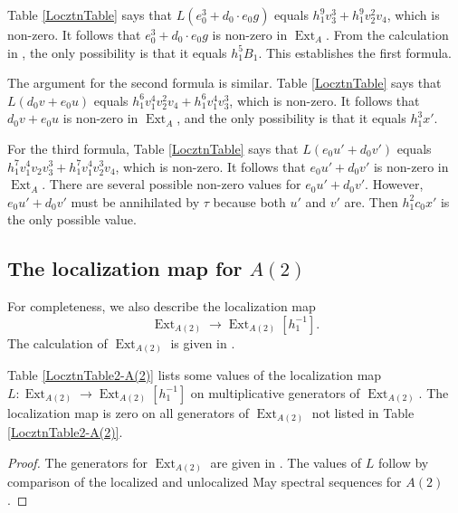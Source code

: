 \documentclass[10pt]{amsart}
\begin{document}
\begin{pf}
Table \ref{LocztnTable} says that 
$L( e_0^3 + d_0 \cdot e_0g)$ equals $h_1^9 v_3^3 + h_1^9 v_2^2 v_4$, which is non-zero.
It follows that $e_0^3+d_0 \cdot e_0g$ is non-zero in $\operatorname{Ext}_A$. 
From the calculation in \cite{Istems}, 
the only possibility is that it equals $h_1^5 B_1$.
This establishes the first formula.

The argument for the second formula is similar.
Table \ref{LocztnTable} says that 
$L(d_0 v + e_0 u )$ equals
$h_1^6 v_1^4 v_2^2 v_4 + h_1^6 v_1^4 v_3^3$, which is non-zero.
It follows that 
$d_0 v + e_0 u$ is non-zero in $\operatorname{Ext}_A$, and the only possibility is that
it equals $h_1^3 x'$.

For the third formula,
Table \ref{LocztnTable} says that
$L(e_0 u' + d_0 v')$ equals
$h_1^7 v_1^4 v_2 v_3^3 + h_1^7 v_1^4 v_2^3 v_4$, which is non-zero.
It follows that 
$e_0 u' + d_0 v'$ is non-zero in $\operatorname{Ext}_A$.
There are several possible non-zero values for $e_0 u' + d_0 v'$.
However,
$e_0 u' + d_0 v'$ must be annihilated by $\tau$ because both
$u'$ and $v'$ are.
Then  
$h_1^2 c_0 x'$ is the only possible value.
\end{pf}

\subsection{The localization map for $A(2)$}

For completeness, we also describe the localization map 
\[ \operatorname{Ext}_{A(2)}{\longrightarrow} \operatorname{Ext}_{A(2)}[h_1^{-1}].
 \]
The calculation of $\operatorname{Ext}_{A(2)}$ is given in \cite{IMotA(2)}.

\begin{prop}
Table \ref{LocztnTable2-A(2)} lists some values of the localization map
$L: \operatorname{Ext}_{A(2)} {\longrightarrow} \operatorname{Ext}_{A(2)}[h_1^{-1}]$ on multiplicative generators
of $\operatorname{Ext}_{A(2)}$.  The localization map is zero on all
generators of $\operatorname{Ext}_{A(2)}$ not listed in Table \ref{LocztnTable2-A(2)}.
\end{prop}

\begin{proof}
The generators for $\operatorname{Ext}_{A(2)}$ are given in \cite[Table 7]{IMotA(2)}.
The values of $L$ follow by comparison of the localized and unlocalized
May spectral sequences for $A(2)$.
\end{proof}
\end{document}
